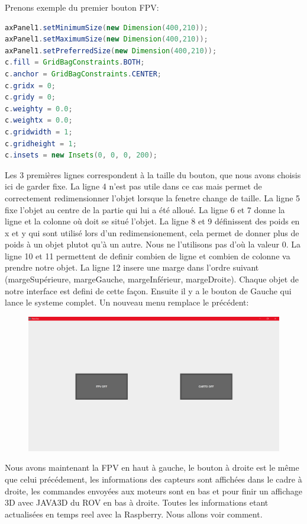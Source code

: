 \documentclass[a4paper,11pt]{report}
\begin{document}
				\newpage Prenons exemple du premier bouton FPV:
				\begin{lstlisting}[language=java]
axPanel1.setMinimumSize(new Dimension(400,210));
axPanel1.setMaximumSize(new Dimension(400,210));
axPanel1.setPreferredSize(new Dimension(400,210));
c.fill = GridBagConstraints.BOTH;
c.anchor = GridBagConstraints.CENTER;
c.gridx = 0;
c.gridy = 0;
c.weighty = 0.0;
c.weightx = 0.0;
c.gridwidth = 1;
c.gridheight = 1;
c.insets = new Insets(0, 0, 0, 200);
				\end{lstlisting}
				Les 3 premières lignes correspondent à la taille du bouton, que nous avons choisis ici de garder fixe.
				\newline La ligne 4 n'est pas utile dans ce cas mais permet de correctement redimensionner l'objet lorsque la fenetre change de taille.
				\newline La ligne 5 fixe l'objet au centre de la partie qui lui a été alloué.
				\newline La ligne 6 et 7 donne la ligne et la colonne où doit se situé l'objet.
				\newline La ligne 8 et 9 définissent des poids en x et y qui sont utilisé lors d'un redimensionement, cela permet de donner plus de poids à un objet plutot qu'à un autre. Nous ne l'utilisons pas d'où la valeur 0.
				\newline La ligne 10 et 11 permettent de definir combien de ligne et combien de colonne va prendre notre objet.
				\newline La ligne 12 insere une marge dans l'ordre suivant (margeSupérieure, margeGauche, margeInférieur, margeDroite).
				\newline Chaque objet de notre interface est defini de cette façon.
				\newline \newline Ensuite il y a le bouton de Gauche qui lance le systeme complet. Un nouveau menu remplace le précédent:
				\begin{figure}[!h]
					\begin{center}
						\includegraphics[scale=0.3]{Photos/Interface1.png}
					\end{center}
				\end{figure}
				\newline Nous avons maintenant la FPV en haut à gauche, le bouton à droite est le même que celui précédement, les informations des capteurs sont affichées dans le cadre à droite, les commandes envoyées aux moteurs sont en bas et pour finir un affichage 3D avec JAVA3D du ROV en bas à droite. Toutes les informations etant actualisées en temps reel avec la Raspberry. Nous allons voir comment.
\end{document}
